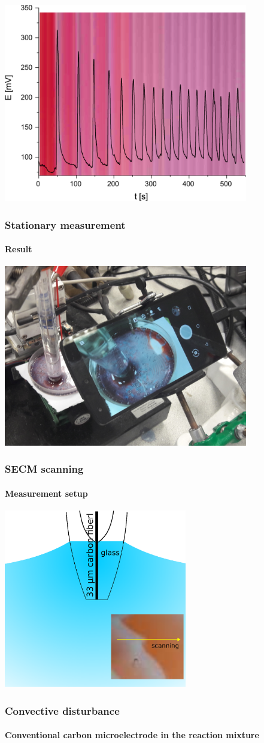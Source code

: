 \documentclass{beamer}
\begin{document}
\begin{frame}
	\centering
	\includegraphics[width=0.8\textwidth]{pontszerumeres.eps}
	\frametitle{Stationary measurement}
	\framesubtitle{Result}
\end{frame}



\begin{frame}
	\centering
	\includegraphics[width=0.8\textwidth]{setup_photo.jpg}
	\frametitle{SECM scanning}
	\framesubtitle{Measurement setup}
\end{frame}

\begin{frame}
	\centering
	\includegraphics[width=0.6\textwidth]{szigeteles1.eps}
	\frametitle{Convective disturbance}
	\framesubtitle{Conventional carbon microelectrode in the reaction mixture}
\end{frame}
\end{document}
